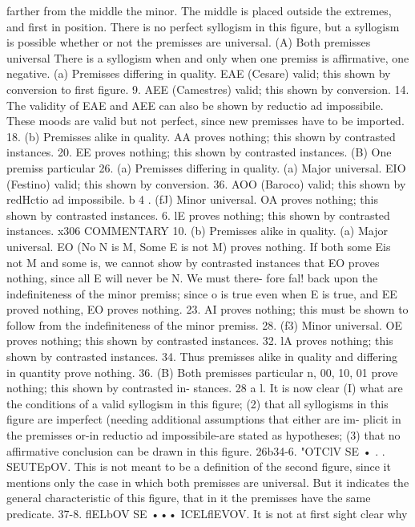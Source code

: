 {{farther from the middle the minor. The middle is placed outside
the extremes, and first in position. There is no perfect syllogism
in this figure, but a syllogism is possible whether or not the
premisses are universal.
(A) Both premisses universal
There is a syllogism when and only when one premiss is
affirmative, one negative. (a) Premisses differing in quality.
EAE (Cesare) valid; this shown by conversion to first figure.
9. AEE (Camestres) valid; this shown by conversion.
14. The validity of EAE and AEE can also be shown by
reductio ad impossibile. These moods are valid but not perfect,
since new premisses have to be imported.
18. (b) Premisses alike in quality. AA proves nothing; this
shown by contrasted instances.
20. EE proves nothing; this shown by contrasted instances.
(B) One premiss particular
26.
(a) Premisses differing in quality. (a) Major universal. EIO
(Festino) valid; this shown by conversion.
36. AOO (Baroco) valid; this shown by redHctio ad impossibile.
b 4 . (fJ) Minor universal. OA proves nothing; this shown by
contrasted instances.
6. lE proves nothing; this shown by contrasted instances.
x306
COMMENTARY
10. (b) Premisses alike in quality. (a) Major universal. EO
(No N is M, Some E is not M) proves nothing. If both some Eis
not M and some is, we cannot show by contrasted instances that
EO proves nothing, since all E will never be N. We must there-
fore fal! back upon the indefiniteness of the minor premiss; since
o is true even when E is true, and EE proved nothing, EO proves
nothing.
23. AI proves nothing; this must be shown to follow from the
indefiniteness of the minor premiss.
28. (f3) Minor universal. OE proves nothing; this shown by
contrasted instances.
32. lA proves nothing; this shown by contrasted instances.
34. Thus premisses alike in quality and differing in quantity
prove nothing.
36.
(B) Both premisses particular
n, 00, 10, 01 prove nothing; this shown by contrasted in-
stances.
28 a l. It is now clear (I) what are the conditions of a valid
syllogism in this figure; (2) that all syllogisms in this figure are
imperfect (needing additional assumptions that either are im-
plicit in the premisses or-in reductio ad impossibile-are stated
as hypotheses; (3) that no affirmative conclusion can be drawn in
this figure.
26b34-6. "OTClV SE • . . SEUTEpOV. This is not meant to be a
definition of the second figure, since it mentions only the case
in which both premisses are universal. But it indicates the general
characteristic of this figure, that in it the premisses have the
same predicate.
37-8. flELbOV SE ••• ICELflEVOV. It is not at first sight clear why
}}
